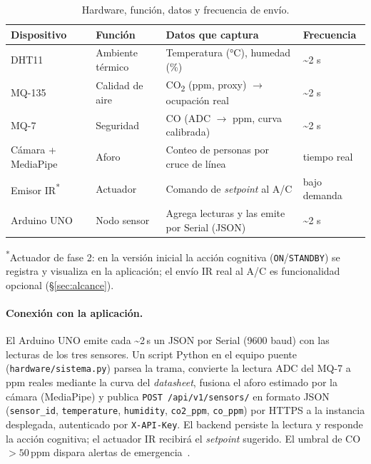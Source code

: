 \documentclass[11pt,a4paper]{article}
\begin{document}
\begin{table}[H]\centering\small
\begin{tabular}{@{}L{2.6cm}L{3.4cm}L{4.2cm}L{3.4cm}@{}}
\toprule
\textbf{Dispositivo} & \textbf{Función} & \textbf{Datos que captura} & \textbf{Frecuencia} \\
\midrule
DHT11 & Ambiente térmico & Temperatura (°C), humedad (\%) & \textasciitilde 2 s \\
MQ-135 & Calidad de aire & CO\textsubscript{2} (ppm, proxy) $\rightarrow$ ocupación real & \textasciitilde 2 s \\
MQ-7 & Seguridad & CO (ADC $\rightarrow$ ppm, curva calibrada) & \textasciitilde 2 s \\
Cámara + MediaPipe & Aforo & Conteo de personas por cruce de línea & tiempo real \\
Emisor IR\textsuperscript{*} & Actuador & Comando de \emph{setpoint} al A/C & bajo demanda \\
Arduino UNO & Nodo sensor & Agrega lecturas y las emite por Serial (JSON) & \textasciitilde 2 s \\
\bottomrule
\end{tabular}
\caption{Hardware, función, datos y frecuencia de envío.}
{\footnotesize\raggedright \textsuperscript{*}Actuador de fase 2: en la
versión inicial la acción cognitiva (\texttt{ON}/\texttt{STANDBY}) se registra
y visualiza en la aplicación; el envío IR real al A/C es funcionalidad
opcional (§\ref{sec:alcance}).\par}
\end{table}

\paragraph{Conexión con la aplicación.} El Arduino UNO emite cada
\textasciitilde 2\,s un JSON por Serial (9600 baud) con las lecturas de los
tres sensores. Un script Python en el equipo puente
(\texttt{hardware/sistema.py}) parsea la trama, convierte la lectura ADC del
MQ-7 a ppm reales mediante la curva del \emph{datasheet}, fusiona el aforo
estimado por la cámara (MediaPipe) y publica \texttt{POST /api/v1/sensors/}
en formato JSON (\texttt{sensor\_id}, \texttt{temperature}, \texttt{humidity},
\texttt{co2\_ppm}, \texttt{co\_ppm}) por HTTPS a la instancia desplegada,
autenticado por \texttt{X-API-Key}. El backend persiste la lectura y responde
la acción cognitiva; el actuador IR recibirá el \emph{setpoint} sugerido. El
umbral de CO $>50$\,ppm dispara alertas de emergencia~\cite{epaco}.
\end{document}

